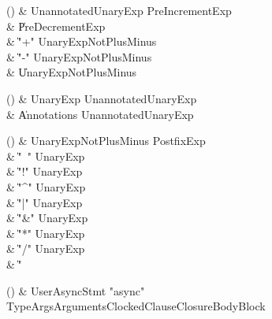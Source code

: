 \begin{bbgrammarappendix}{3.1in}

() & UnannotatedUnaryExp \label{prod:UnannotatedUnaryExp}  \: PreIncrementExp  \\

 &    \| PreDecrementExp \\
 &    \| \xcd"+" UnaryExpNotPlusMinus \\
 &    \| \xcd"-" UnaryExpNotPlusMinus \\
 &    \| UnaryExpNotPlusMinus \\

\end{bbgrammarappendix}

\begin{bbgrammarappendix}{4.2in}

() & UnaryExp \label{prod:UnaryExp}  \: UnannotatedUnaryExp  \\

 &    \| Annotations UnannotatedUnaryExp \\

\end{bbgrammarappendix}

\begin{bbgrammarappendix}{3.0in}

() & UnaryExpNotPlusMinus \label{prod:UnaryExpNotPlusMinus}  \: PostfixExp  \\

 &    \| \xcd"~" UnaryExp \\
 &    \| \xcd"!" UnaryExp \\
 &    \| \xcd"^" UnaryExp \\
 &    \| \xcd"|" UnaryExp \\
 &    \| \xcd"&" UnaryExp \\
 &    \| \xcd"*" UnaryExp \\
 &    \| \xcd"/" UnaryExp \\
 &    \| \xcd"%

\end{bbgrammarappendix}

\begin{bbgrammarappendix}{3.8in}

() & UserAsyncStmt \label{prod:UserAsyncStmt}  \:
 \xcd"async" TypeArgs\opt Arguments\opt ClockedClause\opt ClosureBodyBlock

\end{bbgrammarappendix}

